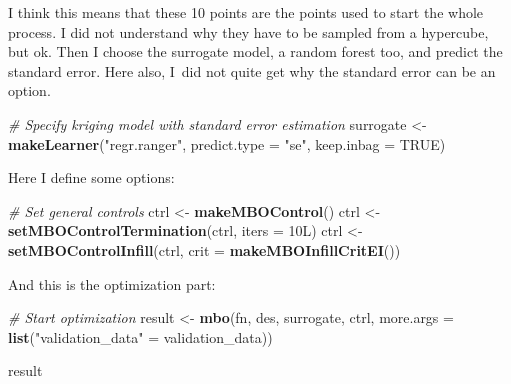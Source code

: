 \documentclass[]{gitbook}
\newenvironment{Shaded}{\begin{snugshade}}{\end{snugshade}}
\newcommand{\CommentTok}[1]{\textcolor[rgb]{0.56,0.35,0.01}{\textit{#1}}}
\newcommand{\DataTypeTok}[1]{\textcolor[rgb]{0.13,0.29,0.53}{#1}}
\newcommand{\KeywordTok}[1]{\textcolor[rgb]{0.13,0.29,0.53}{\textbf{#1}}}
\newcommand{\NormalTok}[1]{#1}
\newcommand{\OtherTok}[1]{\textcolor[rgb]{0.56,0.35,0.01}{#1}}
\newcommand{\StringTok}[1]{\textcolor[rgb]{0.31,0.60,0.02}{#1}}
\begin{document}
I think this means that these 10 points are the points used to start the whole process. I did not
understand why they have to be sampled from a hypercube, but ok. Then I choose the surrogate model,
a random forest too, and predict the standard error. Here also, I~did not quite get why the
standard error can be an option.

\begin{Shaded}
\begin{Highlighting}[]
\CommentTok{# Specify kriging model with standard error estimation}
\NormalTok{surrogate <-}\StringTok{ }\KeywordTok{makeLearner}\NormalTok{(}\StringTok{"regr.ranger"}\NormalTok{, }\DataTypeTok{predict.type =} \StringTok{"se"}\NormalTok{, }\DataTypeTok{keep.inbag =} \OtherTok{TRUE}\NormalTok{)}
\end{Highlighting}
\end{Shaded}

Here I define some options:

\begin{Shaded}
\begin{Highlighting}[]
\CommentTok{# Set general controls}
\NormalTok{ctrl <-}\StringTok{ }\KeywordTok{makeMBOControl}\NormalTok{()}
\NormalTok{ctrl <-}\StringTok{ }\KeywordTok{setMBOControlTermination}\NormalTok{(ctrl, }\DataTypeTok{iters =}\NormalTok{ 10L)}
\NormalTok{ctrl <-}\StringTok{ }\KeywordTok{setMBOControlInfill}\NormalTok{(ctrl, }\DataTypeTok{crit =} \KeywordTok{makeMBOInfillCritEI}\NormalTok{())}
\end{Highlighting}
\end{Shaded}

And this is the optimization part:

\begin{Shaded}
\begin{Highlighting}[]
\CommentTok{# Start optimization}
\NormalTok{result <-}\StringTok{ }\KeywordTok{mbo}\NormalTok{(fn, des, surrogate, ctrl, }\DataTypeTok{more.args =} \KeywordTok{list}\NormalTok{(}\StringTok{"validation_data"}\NormalTok{ =}\StringTok{ }\NormalTok{validation_data))}
\end{Highlighting}
\end{Shaded}

\begin{Shaded}
\begin{Highlighting}[]
\NormalTok{result}
\end{Highlighting}
\end{Shaded}
\end{document}
